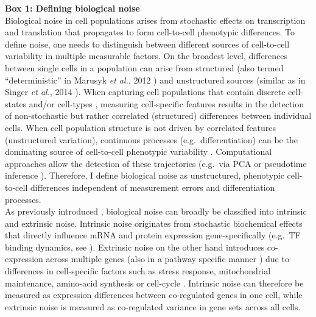 \begin{Comment}
\hspace{-2.5mm}\textbf{Box 1: Defining biological noise}\label{box1}\\
\small
Biological noise in cell populations arises from stochastic effects on transcription and translation that propagates to form cell-to-cell phenotypic differences. To define noise, one needs to distinguish between different sources of cell-to-cell variability in multiple measurable factors. On the broadest level, differences between single cells in a population can arise from structured (also termed “deterministic” in Marusyk \emph{et al.}, 2012 \citep{Marusyk2012}) and unstructured sources (similar as in Singer \emph{et al.}, 2014 \citep{Singer2014}). When capturing cell populations that contain discrete cell-states and/or cell-types \citep{Paul2015, Ibarra-Soria2018, Rosenberg2018}, measuring cell-specific features results in the detection of non-stochastic but rather correlated (structured) differences between individual cells. When cell population structure is not driven by correlated features (unstructured variation), continuous processes (e.g.~differentiation) can be the dominating source of cell-to-cell phenotypic variability \citep{Dahlin2018}. Computational approaches allow the detection of these trajectories (e.g.~via \gls{PCA} or pseudotime inference \citep{Trapnell2014, Angerer2015}). Therefore, I define biological noise as unstructured, phenotypic cell-to-cell differences independent of measurement errors and differentiation processes. \\

As previously introduced \citep{Elowitz2002}, biological noise can broadly be classified into intrinsic and extrinsic noise. Intrinsic noise originates from stochastic biochemical effects that directly influence mRNA and protein expression gene-specifically (e.g.~\gls{TF} binding dynamics, see \citep{Swain2002}). Extrinsic noise on the other hand introduces co-expression across multiple genes (also in a pathway specific manner \citep{Raser2010}) due to differences in cell-specific factors such as stress response, mitochondrial maintenance, amino-acid synthesis \citep{Stewart-Ornstein2012} or cell-cycle \citep{Zopf2013}. Intrinsic noise can therefore be measured as expression differences between co-regulated genes in one cell, while extrinsic noise is measured as co-regulated variance in gene sets across all cells.
\end{Comment}

\newpage

